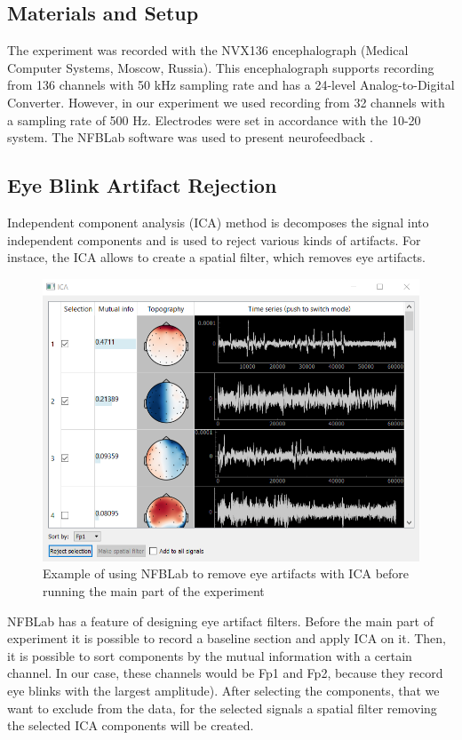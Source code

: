 \documentclass[14pt,a4paper]{scrartcl}
\begin{document}
\subsection{Materials and Setup}
\label{sec:Methods:Materials and Setup}

The experiment was recorded with the NVX136 encephalograph (Medical Computer Systems, Moscow, Russia). This encephalograph supports recording from 136 channels with 50 kHz sampling rate and has a 24-level Analog-to-Digital Converter. However, in our experiment we used recording from 32 channels with a sampling rate of 500 Hz. Electrodes were set in accordance with the 10-20 system. The NFBLab software was used to present  neurofeedback \cite{Smetanin2016}. 

\subsection{Eye Blink Artifact Rejection}
\label{sec:Methods:Eye Blink Artifact Rejection}

Independent component analysis (ICA) method is decomposes the signal into independent components and is used to reject various kinds of artifacts. For instace, the ICA allows to create a spatial filter, which removes eye artifacts. 

\begin{figure}[H]
\centering
\includegraphics[width=0.7\linewidth]{ica}
\caption{Example of using NFBLab to remove eye artifacts with ICA before running the main part of the experiment \cite{Smetanin2016}}\label{fig:ica}
\end{figure}

NFBLab has a feature of designing eye artifact filters. Before the main part of experiment it is possible to record a baseline section and apply ICA on it. Then, it is possible to sort components by the mutual information with a certain channel. In our case, these channels would be Fp1 and Fp2, because they record eye blinks with the largest amplitude). After selecting the components, that we want to exclude from the data, for the selected signals a spatial filter removing the selected ICA components will be created.
\end{document}
